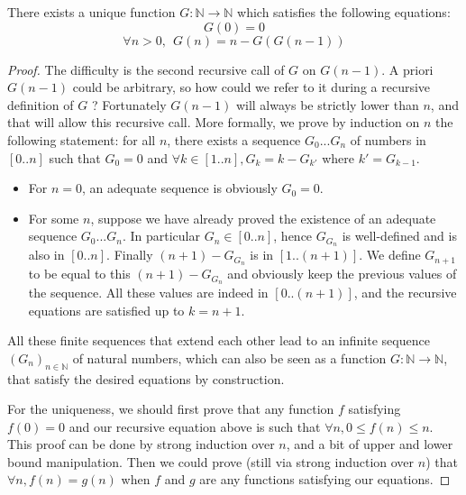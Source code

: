 \documentclass[a4paper,11pt]{article}
\begin{document}
\begin{theorem}\label{defG}There exists a unique function
  $G:\mathbb{N}\to\mathbb{N}$ which satisfies the following
  equations:
  $$G(0) = 0$$
  $$\forall n>0,~~ G(n) = n - G(G(n-1))$$
\end{theorem}
\begin{proof}
The difficulty is the second recursive call of $G$ on $G(n-1)$.
A priori $G(n-1)$ could be arbitrary, so how could we refer to it
during a recursive definition of $G$ ? Fortunately $G(n-1)$ will
always be strictly lower than $n$, and that will allow this recursive
call. More formally, we prove by induction on $n$ the following
statement: for all $n$, there exists a sequence $G_0...G_n$
of numbers in $[0..n]$ such that $G_0=0$ and
$\forall k\in[1..n], G_k = k - G_{k'}$ where $k' = G_{k-1}$.
\begin{itemize}
\item For $n=0$, an adequate sequence is obviously $G_0 = 0$.
\item For some $n$, suppose we have already proved the existence
  of an adequate sequence $G_0...G_n$.
  In particular $G_n \in [0..n]$, hence $G_{G_n}$
  is well-defined and is also in $[0..n]$. Finally $(n+1)-G_{G_n}$
  is in $[1..(n+1)]$. We define $G_{n+1}$ to be equal to this
  $(n+1)-G_{G_n}$ and obviously keep the previous values of the
  sequence. All these values are indeed in $[0..(n+1)]$, and the
  recursive equations are satisfied up to $k=n+1$. 
\end{itemize}
All these finite sequences that extend each other
lead to an infinite sequence $(G_n)_{n\in\mathbb{N}}$ of natural
numbers, which can also be seen as a function
$G:\mathbb{N}\to\mathbb{N}$, that satisfy the desired equations
by construction.

For the uniqueness, we should first prove that any function $f$
satisfying $f(0)=0$ and our recursive equation above is such that
$\forall n, 0\le f(n)\le n$. This proof can be done by strong
induction over $n$, and a bit of upper and lower bound manipulation.
Then we could prove (still via strong induction
over $n$) that $\forall n, f(n)=g(n)$ when $f$ and $g$
are any functions satisfying our equations. 
\end{proof}
\end{document}
